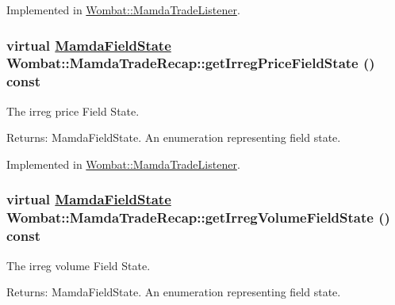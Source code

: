 Implemented in \hyperlink{classWombat_1_1MamdaTradeListener_3949dbc87861899ae66b1ee7173011b4}{Wombat::Mamda\-Trade\-Listener}.\hypertarget{classWombat_1_1MamdaTradeRecap_1d1057e7954bcab91c82c327944b622d}{
\subsubsection[getIrregPriceFieldState]{\setlength{\rightskip}{0pt plus 5cm}virtual \hyperlink{namespaceWombat_93aac974f2ab713554fd12a1fa3b7d2a}{Mamda\-Field\-State} Wombat::Mamda\-Trade\-Recap::get\-Irreg\-Price\-Field\-State () const}}
\label{classWombat_1_1MamdaTradeRecap_1d1057e7954bcab91c82c327944b622d}


The irreg price Field State. 

\begin{Desc}
\item[Returns:]Mamda\-Field\-State. An enumeration representing field state. \end{Desc}


Implemented in \hyperlink{classWombat_1_1MamdaTradeListener_5c3e195cc4c8d41f3a56e9c9a39730dd}{Wombat::Mamda\-Trade\-Listener}.\hypertarget{classWombat_1_1MamdaTradeRecap_b6b5d24579ced7928a72bb76518e10fa}{
\subsubsection[getIrregVolumeFieldState]{\setlength{\rightskip}{0pt plus 5cm}virtual \hyperlink{namespaceWombat_93aac974f2ab713554fd12a1fa3b7d2a}{Mamda\-Field\-State} Wombat::Mamda\-Trade\-Recap::get\-Irreg\-Volume\-Field\-State () const}}
\label{classWombat_1_1MamdaTradeRecap_b6b5d24579ced7928a72bb76518e10fa}


The irreg volume Field State. 

\begin{Desc}
\item[Returns:]Mamda\-Field\-State. An enumeration representing field state. \end{Desc}


